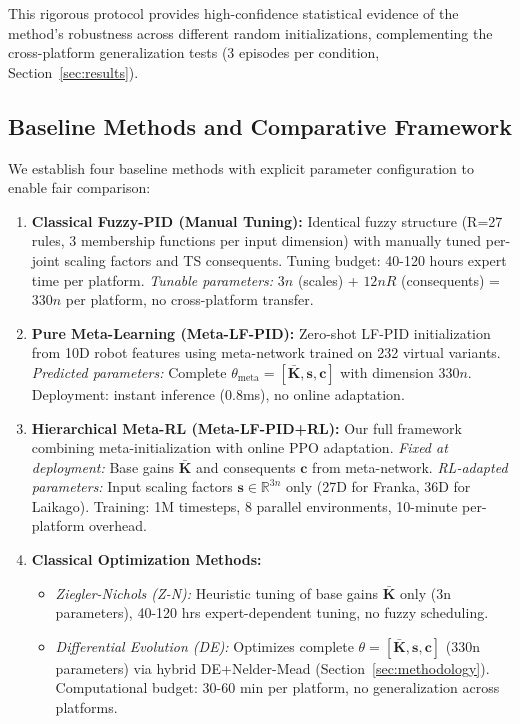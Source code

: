 \documentclass[a4paper]{cas-sc}
\begin{document}
This rigorous protocol provides high-confidence statistical evidence of the method's robustness across different random initializations, complementing the cross-platform generalization tests (3 episodes per condition, Section~\ref{sec:results}).

\subsection{Baseline Methods and Comparative Framework}
\label{sec:baselines}

We establish four baseline methods with explicit parameter configuration to enable fair comparison:

\begin{enumerate}[leftmargin=*, itemsep=3pt]
    \item \textbf{Classical Fuzzy-PID (Manual Tuning):} Identical fuzzy structure (R=27 rules, 3 membership functions per input dimension) with manually tuned per-joint scaling factors and TS consequents. Tuning budget: 40-120 hours expert time per platform. \textit{Tunable parameters:} $3n$ (scales) + $12nR$ (consequents) = $330n$ per platform, no cross-platform transfer.
    
    \item \textbf{Pure Meta-Learning (Meta-LF-PID):} Zero-shot LF-PID initialization from 10D robot features using meta-network trained on 232 virtual variants. \textit{Predicted parameters:} Complete $\theta_{\text{meta}} = [\bar{\bm{K}}, \bm{s}, \bm{c}]$ with dimension $330n$. Deployment: instant inference (0.8ms), no online adaptation.
    
    \item \textbf{Hierarchical Meta-RL (Meta-LF-PID+RL):} Our full framework combining meta-initialization with online PPO adaptation. \textit{Fixed at deployment:} Base gains $\bar{\bm{K}}$ and consequents $\bm{c}$ from meta-network. \textit{RL-adapted parameters:} Input scaling factors $\bm{s} \in \mathbb{R}^{3n}$ only (27D for Franka, 36D for Laikago). Training: 1M timesteps, 8 parallel environments, 10-minute per-platform overhead.
    
    \item \textbf{Classical Optimization Methods:}
    \begin{itemize}[leftmargin=*, itemsep=1pt]
        \item \textit{Ziegler-Nichols (Z-N):} Heuristic tuning of base gains $\bar{\bm{K}}$ only (3n parameters), 40-120 hrs expert-dependent tuning, no fuzzy scheduling.
        \item \textit{Differential Evolution (DE):} Optimizes complete $\theta = [\bar{\bm{K}}, \bm{s}, \bm{c}]$ (330n parameters) via hybrid DE+Nelder-Mead (Section~\ref{sec:methodology}). Computational budget: 30-60 min per platform, no generalization across platforms.
    \end{itemize}
\end{enumerate}
\end{document}
